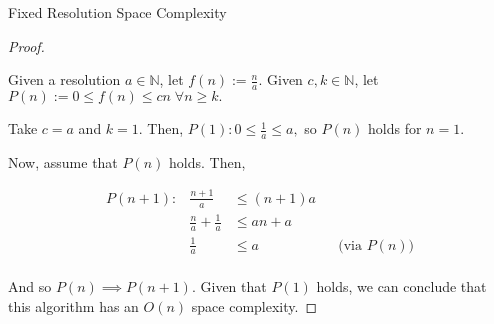 \begin{theorem}{Fixed Resolution Space Complexity}
\label{thm:fixed-resolution-algo-space-complexity}

\end{theorem}

\begin{proof}
\label{prf:fixed-resolution-algo-space-complexity}

Given a resolution $a \in \mathbb{N}$, let $f(n) := \frac{n}{a}$. Given $c, k \in \mathbb{N}$, let $P(n) := 0 \le f(n) \le cn \; \forall n \ge k.$

Take $c = a$ and $k = 1$. Then, $P(1): 0 \le \frac{1}{a} \le a,$ so $P(n)$ holds for $n = 1$.

Now, assume that $P(n)$ holds. Then,

\begin{align*}
    P(n + 1) :& \frac{n + 1}{a} &\le (n + 1)a \\
    & \frac{n}{a}  + \frac{1}{a} &\le an + a \\
    & \frac{1}{a} &\le a &&\text{(via $P(n)$)}\\
\end{align*}

And so $P(n) \implies P(n + 1).$ Given that $P(1)$ holds, we can conclude that this algorithm has an $O(n)$ space complexity.

\end{proof}
